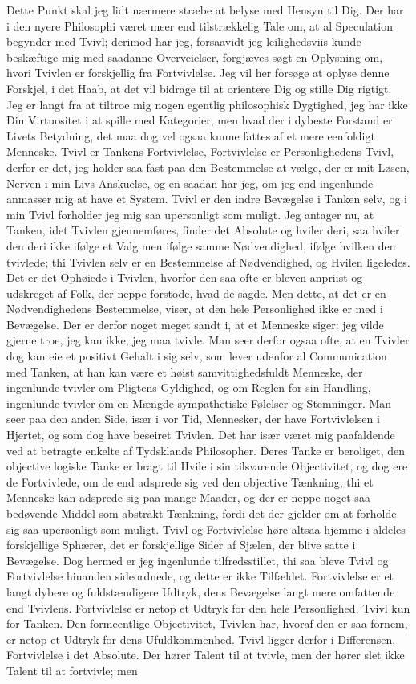 \documentclass[12pt,a4paper]{article}
\begin{document}
Dette Punkt skal jeg lidt nærmere stræbe at belyse med Hensyn til Dig. Der har i den nyere Philosophi været meer end tilstrækkelig Tale om, at al Speculation begynder med Tvivl; derimod har jeg, forsaavidt jeg leilighedsviis kunde beskæftige mig med saadanne Overveielser, forgjæves søgt en Oplysning om, hvori Tvivlen er forskjellig fra Fortvivlelse. Jeg vil her forsøge at oplyse denne Forskjel, i det Haab, at det vil bidrage til at orientere Dig og stille Dig rigtigt. Jeg er langt fra at tiltroe mig nogen egentlig philosophisk Dygtighed, jeg har ikke Din Virtuositet i at spille med Kategorier, men hvad der i dybeste Forstand er Livets Betydning, det maa dog vel ogsaa kunne fattes af et mere eenfoldigt Menneske. Tvivl er Tankens Fortvivlelse, Fortvivlelse er Personlighedens Tvivl, derfor er det, jeg holder saa fast paa den Bestemmelse at vælge, der er mit Løsen, Nerven i min Livs-Anskuelse, og en saadan har jeg, om jeg end ingenlunde anmasser mig at have et System. Tvivl er den indre Bevægelse i Tanken selv, og i min Tvivl forholder jeg mig saa upersonligt som muligt. Jeg antager nu, at Tanken, idet Tvivlen gjennemføres, finder det Absolute og hviler deri, saa hviler den deri ikke ifølge et Valg men ifølge samme Nødvendighed, ifølge hvilken den tvivlede; thi Tvivlen selv er en Bestemmelse af Nødvendighed, og Hvilen ligeledes. Det er det Ophøiede i Tvivlen, hvorfor den saa ofte er bleven anpriist og udskreget af Folk, der neppe forstode, hvad de sagde. Men dette, at det er en Nødvendighedens Bestemmelse, viser, at den hele Personlighed ikke er med i Bevægelse. Der er derfor noget meget sandt i, at et Menneske siger: jeg vilde gjerne troe, jeg kan ikke, jeg maa tvivle. Man seer derfor ogsaa ofte, at en Tvivler dog kan eie et positivt Gehalt i sig selv, som lever udenfor al Communication med Tanken, at han kan være et høist samvittighedsfuldt Menneske, der ingenlunde tvivler om Pligtens Gyldighed, og om Reglen for sin Handling, ingenlunde tvivler om en Mængde sympathetiske Følelser og Stemninger. Man seer paa den anden Side, især i vor Tid, Mennesker, der have Fortvivlelsen i Hjertet, og som dog have beseiret Tvivlen. Det har især været mig paafaldende ved at betragte enkelte af Tydsklands Philosopher. Deres Tanke er beroliget, den objective logiske Tanke er bragt til Hvile i sin tilsvarende Objectivitet, og dog ere de Fortvivlede, om de end adsprede sig ved den objective Tænkning, thi et Menneske kan adsprede sig paa mange Maader, og der er neppe noget saa bedøvende Middel som abstrakt Tænkning, fordi det der gjelder om at forholde sig saa upersonligt som muligt. Tvivl og Fortvivlelse høre altsaa hjemme i aldeles forskjellige Sphærer, det er forskjellige Sider af Sjælen, der blive satte i Bevægelse. Dog hermed er jeg ingenlunde tilfredsstillet, thi saa bleve Tvivl og Fortvivlelse hinanden sideordnede, og dette er ikke Tilfældet. Fortvivlelse er et langt dybere og fuldstændigere Udtryk, dens Bevægelse langt mere omfattende end Tvivlens. Fortvivlelse er netop et Udtryk for den hele Personlighed, Tvivl kun for Tanken. Den formeentlige Objectivitet, Tvivlen har, hvoraf den er saa fornem, er netop et Udtryk for dens Ufuldkommenhed. Tvivl ligger derfor i Differensen, Fortvivlelse i det Absolute. Der hører Talent til at tvivle, men der hører slet ikke Talent til at fortvivle; men 
\end{document}
